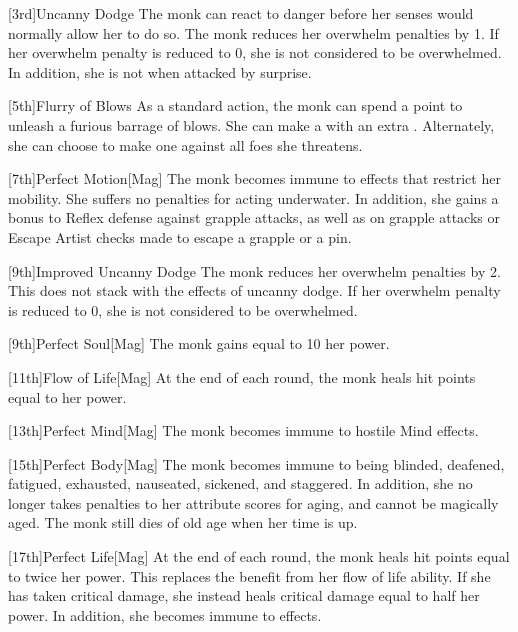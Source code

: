         [3rd]{Uncanny Dodge}
        The monk can react to danger before her senses would normally allow her to do so.
        The monk reduces her overwhelm penalties by 1.
        If her overwhelm penalty is reduced to 0, she is not considered to be overwhelmed.
        In addition, she is not \unaware when attacked by surprise.

        [5th]{Flurry of Blows}\label{Flurry of Blows}
        As a standard action, the monk can spend a \ki point to unleash a furious barrage of blows.
        She can make a  with an extra .
        Alternately, she can choose to make one  against all foes she threatens.

        [7th]{Perfect Motion}[Mag]
        The monk becomes immune to effects that restrict her mobility.
        She suffers no penalties for acting underwater.
        In addition, she gains a  bonus to Reflex defense against grapple attacks, as well as on grapple attacks or Escape Artist checks made to escape a grapple or a pin.

        [9th]{Improved Uncanny Dodge}
        The monk reduces her overwhelm penalties by 2.
        This does not stack with the effects of uncanny dodge.
        If her overwhelm penalty is reduced to 0, she is not considered to be overwhelmed.

        [9th]{Perfect Soul}[Mag]
        The monk gains  equal to 10 \add her \ki power.

        [11th]{Flow of Life}[Mag]
        At the end of each round, the monk heals hit points equal to her \ki power.

        [13th]{Perfect Mind}[Mag]
        The monk becomes immune to hostile Mind effects.

        [15th]{Perfect Body}[Mag]
        The monk becomes immune to being blinded, deafened, fatigued, exhausted, nauseated, sickened, and staggered.
        In addition, she no longer takes penalties to her attribute scores for aging, and cannot be magically aged.
        The monk still dies of old age when her time is up.

        [17th]{Perfect Life}[Mag]
        At the end of each round, the monk heals hit points equal to twice her \ki power.
        This replaces the benefit from her flow of life ability.
        If she has taken critical damage, she instead heals critical damage equal to half her \ki power.
        In addition, she becomes immune to  effects.

